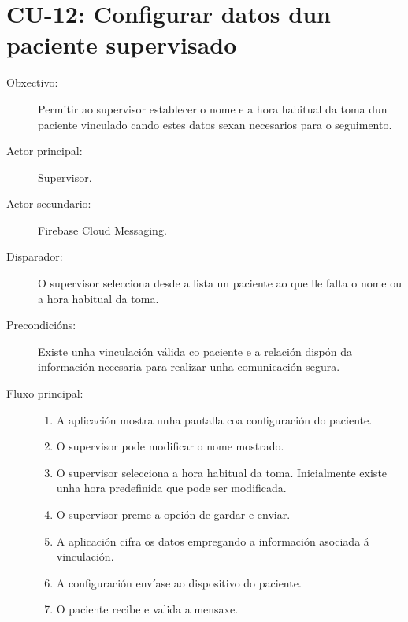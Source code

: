 
\section{CU-12: Configurar datos dun paciente supervisado}
\label{cu:configurar-paciente-supervisado}

\begin{description}

\item[Obxectivo:] Permitir ao supervisor establecer o nome e a hora habitual da
toma dun paciente vinculado cando estes datos sexan necesarios para o
seguimento.

\item[Actor principal:] Supervisor.

\item[Actor secundario:] Firebase Cloud Messaging.

\item[Disparador:] O supervisor selecciona desde a lista un paciente ao que lle
falta o nome ou a hora habitual da toma.

\item[Precondicións:] Existe unha vinculación válida co paciente e a relación
dispón da información necesaria para realizar unha comunicación segura.

\item[Fluxo principal:] \hfill
\begin{enumerate}
    \item A aplicación mostra unha pantalla coa configuración do paciente.

    \item O supervisor pode modificar o nome mostrado.

    \item O supervisor selecciona a hora habitual da toma. Inicialmente existe
    unha hora predefinida que pode ser modificada.

    \item O supervisor preme a opción de gardar e enviar.

    \item A aplicación cifra os datos empregando a información asociada á
    vinculación.

    \item A configuración envíase ao dispositivo do paciente.

    \item O paciente recibe e valida a mensaxe.


\end{enumerate}
\end{description}
